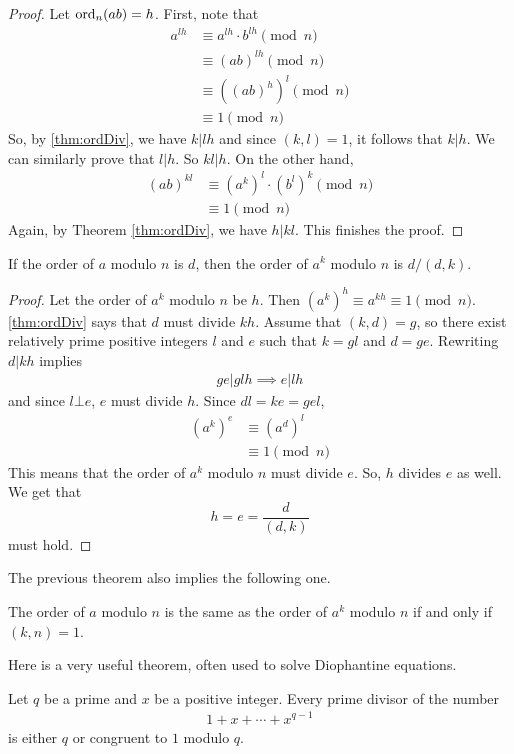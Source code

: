 \documentclass{subfile}
\begin{document}
	\begin{proof}
		Let $\operatorname{ord}_n(ab)=h$. First, note that
			\begin{align*}
				a^{lh}
					& \equiv a^{lh}\cdot b^{lh}\pmod{n}\\
					& \equiv (ab)^{lh}\pmod{n}\\
					& \equiv \left((ab)^h\right)^l\pmod{n}\\
					& \equiv 1 \pmod n
			\end{align*}
		So, by \autoref{thm:ordDiv}, we have $k|lh$ and since $(k,l)=1$, it follows that $k|h$. We can similarly prove that $l|h$. So $kl|h$. On the other hand,
			\begin{align*}
				(ab)^{kl}
					& \equiv (a^k)^l \cdot (b^l)^k\pmod{n}\\
					& \equiv 1 \pmod n
			\end{align*}
		Again, by Theorem \eqref{thm:ordDiv}, we have $h|kl$. This finishes the proof.
	\end{proof}

	\begin{theorem}
		If the order of $a$ modulo $n$ is $d$, then the order of $a^k$ modulo $n$ is $d/{(d,k)}$.
	\end{theorem}

	\begin{proof}
		Let the order of $a^k$ modulo $n$ be $h$. Then $\left(a^k\right)^h \equiv a^{kh} \equiv 1\pmod n$. \autoref{thm:ordDiv} says that $d$ must divide $kh$. Assume that $(k,d)=g$, so there exist relatively prime positive integers $l$ and $e$ such that $k=gl$ and $d=ge$. Rewriting $d | kh$ implies
			\begin{align*}
				ge|glh \implies e|lh
			\end{align*}
		and since $l\bot e$, $e$ must divide $h$. Since $dl=ke=gel$,
			\begin{align*}
				\left(a^k\right)^{e}
					& \equiv \left(a^d\right)^{l}\\
					& \equiv 1\pmod n
			\end{align*}
		This means that the order of $a^k$ modulo $n$ must divide $e$. So, $h$ divides $e$ as well. We get that $$h=e=\dfrac{d}{(d,k)}$$ must hold.
	\end{proof}
The previous theorem also implies the following one.
	\begin{theorem}
		The order of $a$ modulo $n$ is the same as the order of $a^k$ modulo $n$ if and only if $(k,n)=1$.
	\end{theorem}
Here is a very useful theorem, often used to solve Diophantine equations.
	\begin{theorem}\label{thm:cyclodiv}
		Let $q$ be a prime and $x$ be a positive integer. Every prime divisor of the number
			\begin{align*}
				1+x+\cdots+x^{q-1}
			\end{align*}
		is either $q$ or congruent to $1$ modulo $q$.
	\end{theorem}
\end{document}

